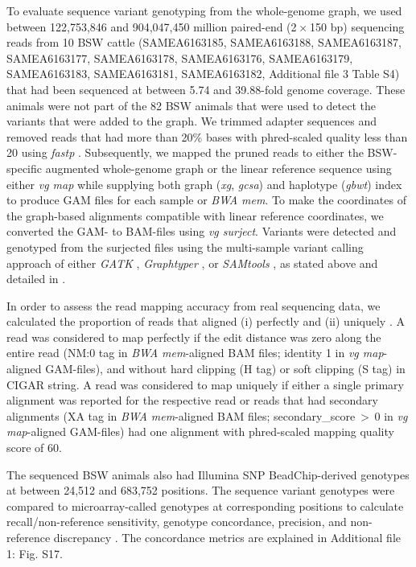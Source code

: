 \documentclass[../main.tex]{subfiles}
\begin{document}
To evaluate sequence variant genotyping from the whole-genome graph, we used between 122,753,846 and 904,047,450 million paired-end (2 × 150 bp) sequencing reads from 10 BSW cattle (SAMEA6163185, SAMEA6163188, SAMEA6163187, SAMEA6163177, SAMEA6163178, SAMEA6163176, SAMEA6163179, SAMEA6163183, SAMEA6163181, SAMEA6163182, Additional file 3 Table S4) that had been sequenced at between 5.74 and 39.88-fold genome coverage. These animals were not part of the 82 BSW animals that were used to detect the variants that were added to the graph. We trimmed adapter sequences and removed reads that had more than 20\% bases with phred-scaled quality less than 20 using \emph{fastp} \citep{chen2018fastp}. Subsequently, we mapped the pruned reads to either the BSW-specific augmented whole-genome graph or the linear reference sequence using either \emph{vg map} while supplying both graph (\emph{xg}, \emph{gcsa}) and haplotype (\emph{gbwt}) index to produce GAM files for each sample or \emph{BWA mem}. To make the coordinates of the graph-based alignments compatible with linear reference coordinates, we converted the GAM- to BAM-files using \emph{vg surject}. Variants were detected and genotyped from the surjected files using the multi-sample variant calling approach of either \emph{GATK} \citep{poplin2017scaling}, \emph{Graphtyper} \citep{eggertsson2017graphtyper}, or \emph{SAMtools} \citep{li2009sequence}, as stated above and detailed in \citep{crysnanto2019accurate}.

In order to assess the read mapping accuracy from real sequencing data, we calculated the proportion of reads that aligned (i) perfectly and (ii) uniquely \citep{pritt2018forge,shukla2019hg19kindel,novak2017genome}. A read was considered to map perfectly if the edit distance was zero along the entire read (NM:0 tag in \emph{BWA mem}-aligned BAM files; identity 1 in \emph{vg map}-aligned GAM-files), and without hard clipping (H tag) or soft clipping (S tag) in CIGAR string. A read was considered to map uniquely if either a single primary alignment was reported for the respective read or reads that had secondary alignments (XA tag in \emph{BWA mem}-aligned BAM files; secondary\_score $>$ 0 in \emph{vg map}-aligned GAM-files) had one alignment with phred-scaled mapping quality score of 60.

The sequenced BSW animals also had Illumina SNP BeadChip-derived genotypes at between 24,512 and 683,752 positions. The sequence variant genotypes were compared to microarray-called genotypes at corresponding positions to calculate recall/non-reference sensitivity, genotype concordance, precision, and non-reference discrepancy \citep{depristo2011framework,linderman2014analytical}. The concordance metrics are explained in Additional file 1: Fig. S17.
\end{document}
